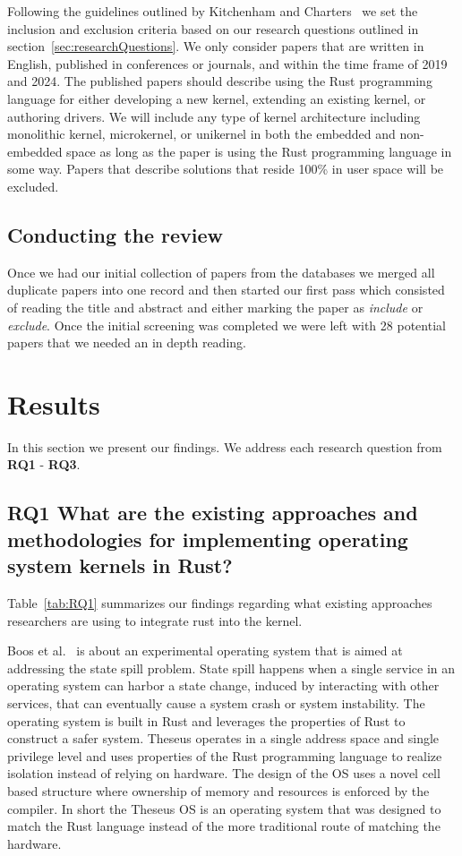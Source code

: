 \documentclass[sigconf]{acmart}
\begin{document}
Following the guidelines outlined by Kitchenham and Charters~\cite{Stuart2007-cc} we set the inclusion and exclusion criteria based on our research questions outlined in section~\ref{sec:researchQuestions}. We only consider papers that are written in English, published in conferences or journals, and within the time frame of 2019 and 2024. The published papers should describe using the Rust programming language for either developing a new kernel, extending an existing kernel, or authoring drivers. We will include any type of kernel architecture including monolithic kernel, microkernel, or unikernel in both the embedded and non-embedded space as long as the paper is using the Rust programming language in some way. Papers that describe solutions that reside 100\% in user space will be excluded.

\subsection{Conducting the review}

Once we had our initial collection of papers from the databases we merged all duplicate papers into one record and then started our first pass which consisted of reading the title and abstract and either marking the paper as \textit{include} or \textit{exclude}. Once  the initial screening was completed we were left with 28 potential papers that we needed an in depth reading.

\section{Results}

In this section we present our findings. We address each research question from \textbf{RQ1} - \textbf{RQ3}.

\subsection{RQ1 What are the existing approaches and methodologies for implementing operating system kernels in Rust?}

Table~\ref{tab:RQ1} summarizes our findings regarding what existing approaches researchers are using to integrate rust into the kernel.

Boos et al.~\cite{Boos2020-zh} is about an experimental operating system that is aimed at addressing the state spill problem. State spill happens when a single service in an operating system can harbor a state change, induced by interacting with other services, that can eventually cause a system crash or system instability. The operating system is built in Rust and leverages the properties of Rust to construct a safer system. Theseus operates in a single address space and single privilege level and uses properties of the Rust programming language to realize isolation instead of relying on hardware. The design of the OS uses a novel cell based structure where ownership of memory and resources is enforced by the compiler. In short the Theseus OS is an operating system that was designed to match the Rust language instead of the more traditional route of matching the hardware.
\end{document}
